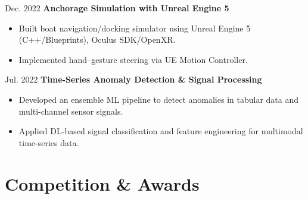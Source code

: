 \documentclass[10pt, letterpaper]{article}
\newenvironment{highlights}{
    \begin{itemize}[
        topsep=0.10 cm,
        parsep=0.10 cm,
        partopsep=0pt,
        itemsep=0pt,
        leftmargin=0.4 cm + 10pt
    ]
}{
    \end{itemize}
} %
\newenvironment{twocolentry_project}[2][]{
    \onecolentry
    \def\secondColumn{#2}
    \setcolumnwidth{\fill, 2.0 cm}
    \begin{paracol}{2}
}{
    \switchcolumn \raggedleft \secondColumn
    \end{paracol}
    \endonecolentry
} %
\begin{document}
    \vspace{0.2 cm}
    \begin{twocolentry_project}{Dec. 2022}
        \textbf{Anchorage Simulation with Unreal Engine 5}
        \begin{highlights}
            \item Built boat navigation/docking simulator using Unreal Engine 5 (C++/Blueprints), Oculus SDK/OpenXR.
            \item Implemented hand–gesture steering via UE Motion Controller.
        \end{highlights}
    \end{twocolentry_project}
    
        
    \vspace{0.2 cm}
    \begin{twocolentry_project}{Jul. 2022}
        \textbf{Time-Series Anomaly Detection \& Signal Processing}
        \begin{highlights}
            \item Developed an ensemble ML pipeline to detect anomalies in tabular data and multi-channel sensor signals.
            \item Applied DL-based signal classification and feature engineering for multimodal time-series data. 
        \end{highlights}
    \end{twocolentry_project}


    
    \vspace{0.2 cm}
    \section{Competition \& Awards}
\end{document}
